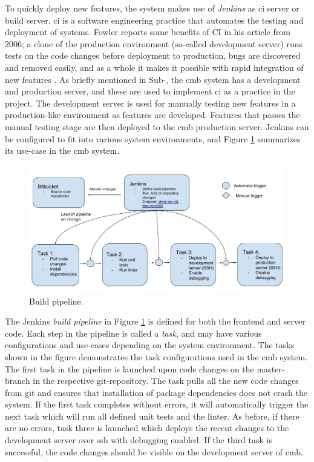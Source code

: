 To quickly deploy new features, the system makes use of \textit{Jenkins} \cite{JENKINS} as \gls{ci} server or build server. \gls{ci} is a software engineering practice that automates the testing and deployment of systems. Fowler reports some benefits of CI in his article from 2006; a clone of the production environment (so-called development server) runs tests on the code changes before deployment to production, bugs are discovered and removed easily, and as a whole it makes it possible with rapid integration of new features \cite{a:F:CI}. As briefly mentioned in Sub-, the \gls{cmb} system has a development and production server, and these are used to implement \gls{ci} as a practice in the project. The development server is used for manually testing new features in a production-like environment as features are developed. Features that passes the manual testing stage are then deployed to the \gls{cmb} production server. Jenkins can be configured to fit into various system environments, and Figure \ref{fig:server-ci} summarizes its use-case in the \gls{cmb} system. \\

\begin{figure}
  \includegraphics[width=1.0\textwidth]{figs/build_pipeline.jpg}
  \caption[Build pipeline.]{Build pipeline.}
  \label{fig:server-ci}
\end{figure}

The Jenkins \textit{build pipeline} in Figure \ref{fig:server-ci} is defined for both the frontend and server code. Each step in the pipeline is called a \textit{task}, and may have various configurations and use-cases depending on the system environment. The tasks shown in the figure demonstrates the task configurations used in the \gls{cmb} system. The first task in the pipeline is launched upon code changes on the master-branch in the respective git-repository. The task pulls all the new code changes from git and ensures that installation of package dependencies does not crash the system. If the first task completes without errors, it will automatically trigger the next task which will run all defined unit tests and the linter. As before, if there are no errors, task three is launched which deploys the recent changes to the development server over \gls{ssh} with debugging enabled. If the third task is successful, the code changes should be visible on the development server of \gls{cmb}. \\

